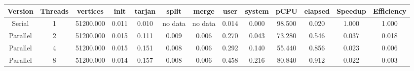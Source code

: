 \begin{tabular}{|c|c|c|c|c|c|c|c|c|c|c|c|c|}
\toprule
 Version &  Threads &  vertices &  init &  tarjan &   split &   merge &  user &  system &   pCPU &  elapsed &  Speedup &  Efficiency \\
\midrule
  Serial &        1 & 51200.000 & 0.011 &   0.010 & no data & no data & 0.014 &   0.000 & 98.500 &    0.020 &    1.000 &       1.000 \\
Parallel &        2 & 51200.000 & 0.015 &   0.111 &   0.009 &   0.006 & 0.270 &   0.043 & 73.280 &    0.546 &    0.037 &       0.018 \\
Parallel &        4 & 51200.000 & 0.015 &   0.151 &   0.008 &   0.006 & 0.292 &   0.140 & 55.440 &    0.856 &    0.023 &       0.006 \\
Parallel &        8 & 51200.000 & 0.014 &   0.157 &   0.008 &   0.006 & 0.458 &   0.216 & 80.840 &    0.912 &    0.022 &       0.003 \\
\bottomrule
\end{tabular}
